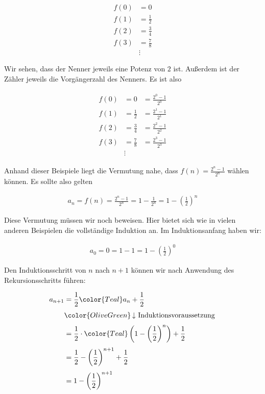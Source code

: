 \documentclass[fontsize=9pt,
               parskip=half-,
               DIV=14,
               listof=chapterentry,
               tocflat]{scrbook}
\begin{document}
\begin{align*}
f(0)&=0\\[0.3em]f(1)&={\frac {1}{2}}\\[0.3em]f(2)&={\frac {3}{4}}\\[0.3em]f(3)&={\frac {7}{8}}\\[0.3em]&\vdots 
\end{align*}

Wir sehen, dass der Nenner jeweils eine Potenz von $2$ ist. Außerdem ist der Zähler jeweils die Vorgängerzahl des Nenners. Es ist also

\begin{align*}
{\begin{array}{rll}f(0)&=0&={\frac {2^{0}-1}{2^{0}}}\\[0.3em]f(1)&={\frac {1}{2}}&={\frac {2^{1}-1}{2^{1}}}\\[0.3em]f(2)&={\frac {3}{4}}&={\frac {2^{2}-1}{2^{2}}}\\[0.3em]f(3)&={\frac {7}{8}}&={\frac {2^{3}-1}{2^{3}}}\\[0.3em]&\vdots \end{array}}
\end{align*}

Anhand dieser Beispiele liegt die Vermutung nahe, dass $f(n)={\frac {2^{n}-1}{2^{n}}}$ wählen können. Es sollte also gelten

\begin{align*}
a_{n}=f(n)={\frac {2^{n}-1}{2^{n}}}=1-{\frac {1}{2^{n}}}=1-\left({\frac {1}{2}}\right)^{n}
\end{align*}

Diese Vermutung müssen wir noch beweisen. Hier bietet sich wie in vielen anderen Beispielen die vollständige Induktion an. Im Induktionsanfang haben wir:

\begin{align*}
a_{0}=0=1-1=1-\left({\frac {1}{2}}\right)^{0}
\end{align*}

Den Induktionsschritt von $n$ nach $n+1$ können wir nach Anwendung des Rekursionsschritts führen:

\begin{align*}
a_{n+1}&={\frac {1}{2}}{\color {Teal}a_{n}}+{\frac {1}{2}}\\[0.3em]&{\color {OliveGreen}\left\downarrow \ {\text{Induktionsvoraussetzung}}\right.}\\[0.3em]&={\frac {1}{2}}\cdot {\color {Teal}\left(1-\left({\frac {1}{2}}\right)^{n}\right)}+{\frac {1}{2}}\\[0.3em]&={\frac {1}{2}}-\left({\frac {1}{2}}\right)^{n+1}+{\frac {1}{2}}\\[0.3em]&=1-\left({\frac {1}{2}}\right)^{n+1}
\end{align*}
\end{document}
